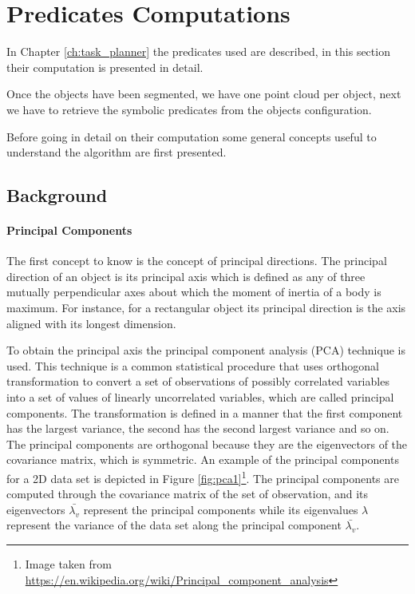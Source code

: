 \section{Predicates Computations}
In Chapter \ref{ch:task_planner}  the predicates used are described, in this section their computation is presented in detail. 

Once the objects have been segmented, we have one point cloud per object, next we have to retrieve the symbolic predicates from the objects configuration. 

Before going in detail on their computation some general concepts useful to understand the algorithm are first presented. 

\subsection{Background}
\paragraph{Principal Components}
The first concept to know is the concept of principal directions. The principal direction of an object is its principal axis which is defined as any of three mutually perpendicular axes about which the moment of inertia of a body is maximum. For instance, for a rectangular object its principal direction is the axis aligned with its longest dimension. 

To obtain the principal axis the principal component analysis (PCA) \citep{PCA} technique is used. This technique is a common statistical procedure that uses orthogonal transformation to convert a set of  observations of possibly correlated variables into a set of values of linearly uncorrelated variables, which are called principal components. The transformation is defined in a manner that the first component has the largest variance, the second has the second largest variance and so on. The principal components are orthogonal because they are the eigenvectors of the covariance matrix, which is symmetric. An example of the principal components for a 2D data set is depicted in Figure \ref{fig:pca1}\footnote{Image taken from \href{https://en.wikipedia.org/wiki/Principal_component_analysis}{https://en.wikipedia.org/wiki/Principal\_component\_analysis}}. The principal components are computed through the covariance matrix of the set of observation, and its eigenvectors $\bar{\lambda_v}$ represent the principal components while its eigenvalues $\lambda$ represent the variance of the data set along the principal component $\bar{\lambda_v}$. 


